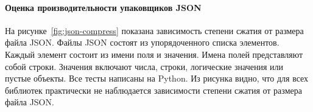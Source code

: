 %	
%	
%	
%	
%	
%	


\paragraph{Оценка производительности упаковщиков JSON}


На рисунке~\cref{fig:json-compress} показана зависимость степени сжатия от размера файла JSON. Файлы JSON состоят из упорядоченного списка элементов. Каждый элемент состоит из имени поля и значения. Имена полей представляют собой строки. Значения включают числа, строки, логические значения или пустые объекты. Все тесты написаны на Python. Из рисунка видно, что для всех библиотек практически не наблюдается зависимости степени сжатия от размера файла JSON.

